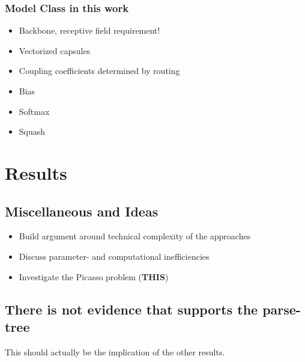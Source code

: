 \documentclass{article}
\begin{document}
\subsubsection*{Model Class in this work}
\begin{itemize}
	\item Backbone, receptive field requirement!
	\item Vectorized capsules
	\item Coupling coefficients determined by routing
	\item Bias
	\item Softmax
	\item Squash
\end{itemize}

\section{Results}
\subsection{Miscellaneous and Ideas}
\begin{itemize}
	\item Build argument around technical complexity of the approaches
	\item Discuss parameter- and computational inefficiencies
	\item Investigate the Picasso problem (\textbf{THIS})
\end{itemize}
\subsection{There is not evidence that supports the parse-tree}
This should actually be the implication of the other results.
\end{document}
